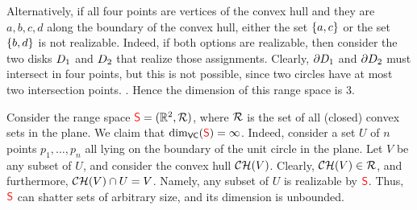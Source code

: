 Alternatively, if all four points are vertices of the convex hull and
they are $a,b,c,d$ along the boundary of the convex hull, either the set
$\left\{ {a, c} \right\}$ or the set $\left\{ {b, d} \right\}$ is not realizable. Indeed, if both
options are realizable, then consider the two disks $D_1$ and
$D_2$ that realize those assignments.  Clearly, ${\partial} D_1$ and
${\partial} D_2$ must intersect in four points, but this is not possible, since
two circles have at most two intersection points.  .  Hence the \VC dimension of this range space is $3$.

\begin{figure}[h]
    \centering%
    \caption{}
\end{figure}





Consider the range space ${\textcolor{red}{\mathsf{S}}} = (\mathbb{R}^2, {\mathcal{R}})$, where
${\mathcal{R}}$ is the set of all (closed) convex sets in the plane.  We
claim that $\mathrm{dim}_{\mathsf{VC}}({\textcolor{red}{\mathsf{S}}})=\infty$. Indeed, consider a set $U$ of
$n$ points $p_1,\ldots, p_n$ all lying on the boundary of the unit circle in
the plane. Let $V$ be any subset of $U$, and consider the convex hull
$\CHX{V}$. Clearly, $\CHX{V} \in \RangeSet$, and furthermore,
$\CHX{V} \cap U = V$. Namely, any subset of $U$ is realizable by
${\textcolor{red}{\mathsf{S}}}$. Thus, ${\textcolor{red}{\mathsf{S}}}$ can shatter sets of arbitrary size,
and its \VC dimension is unbounded.

\begin{figure}[h]
    \centering%
    \caption{}
\end{figure}


